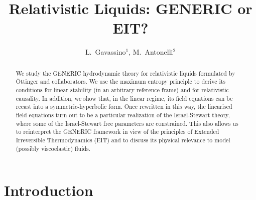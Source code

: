 \documentclass[a4paper, amsfonts, amssymb, amsmath, reprint, showkeys, nofootinbib, twoside, onecolumn, notitlepage]{revtex4-1}
\theoremstyle{definition}
\theoremstyle{theorem}
\begin{document}
\title{Relativistic Liquids: GENERIC or EIT?}
\author{L.~Gavassino$^1$, M.~Antonelli$^{2}$}


\begin{abstract}
We study the GENERIC hydrodynamic theory for relativistic liquids formulated by \"{O}ttinger and collaborators. We use the maximum entropy principle to derive its conditions for linear stability (in an arbitrary reference frame) and for relativistic causality. In addition, we show that, in the linear regime, its field equations can be recast into a symmetric-hyperbolic form. Once rewritten in this way, the linearised field equations turn out to be a particular realization of the Israel-Stewart theory, where some of the Israel-Stewart free parameters are constrained. This also allows us to reinterpret the GENERIC framework in view of the principles of Extended Irreversible Thermodynamics (EIT) and to discuss its physical relevance to model (possibly viscoelastic) fluids.
\end{abstract} 

\maketitle

\section{Introduction}
\label{intro}
\end{document}
